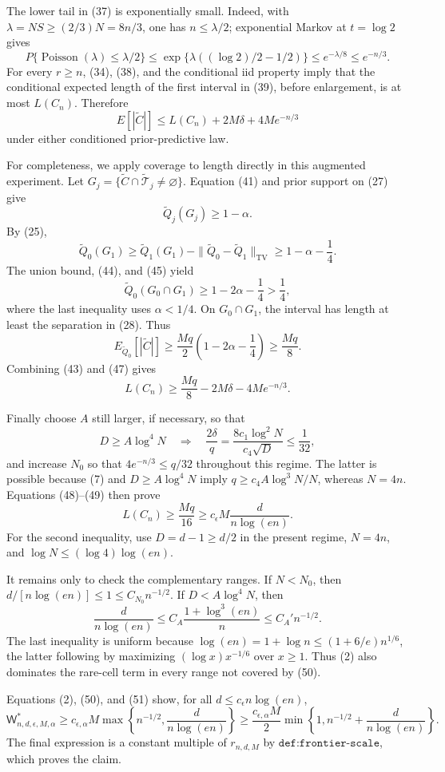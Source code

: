 The lower tail in (37) is exponentially small.  Indeed, with
\(\lambda=NS\ge(2/3)N=8n/3\), one has \(n\le\lambda/2\); exponential Markov at \(t=\log2\) gives
\[
 P\{\operatorname{Poisson}(\lambda)\le\lambda/2\}
 \le \exp\{\lambda((\log2)/2-1/2)\}
 \le e^{-\lambda/8}\le e^{-n/3}.
\tag{42}
\]
For every \(r\ge n\), (34), (38), and the conditional iid property imply that the conditional expected length of the first interval in (39), before enlargement, is at most \(L(C_n)\).  Therefore
\[
 E[|\widetilde C|]
 \le L(C_n)+2M\delta+4Me^{-n/3}
\tag{43}
\]
under either conditioned prior-predictive law.

For completeness, we apply coverage to length directly in this augmented experiment.  Let
\(G_j=\{\widetilde C\cap\widetilde{\mathcal T}_j\ne\varnothing\}\).  Equation (41) and prior support on (27) give
\[
 \widetilde Q_j(G_j)\ge1-\alpha.
\tag{44}
\]
By (25),
\[
 \widetilde Q_0(G_1)
 \ge\widetilde Q_1(G_1)
   -\|\widetilde Q_0-\widetilde Q_1\|_{\mathrm{TV}}
 \ge1-\alpha-\frac14.
\tag{45}
\]
The union bound, (44), and (45) yield
\[
 \widetilde Q_0(G_0\cap G_1)
 \ge1-2\alpha-\frac14>\frac14,
\tag{46}
\]
where the last inequality uses \(\alpha<1/4\).  On \(G_0\cap G_1\), the interval has length at least the separation in (28).  Thus
\[
 E_{\widetilde Q_0}[|\widetilde C|]
 \ge \frac{Mq}{2}\left(1-2\alpha-\frac14\right)
 \ge\frac{Mq}{8}.
\tag{47}
\]
Combining (43) and (47) gives
\[
 L(C_n)\ge\frac{Mq}{8}-2M\delta-4Me^{-n/3}.
\tag{48}
\]

Finally choose \(A\) still larger, if necessary, so that
\[
 D\ge A\log^4N
 \quad\Longrightarrow\quad
 \frac{2\delta}{q}
 =\frac{8c_1\log^2N}{c_4\sqrt D}\le\frac1{32},
\tag{49}
\]
and increase \(N_0\) so that \(4e^{-n/3}\le q/32\) throughout this regime.  The latter is possible because (7) and \(D\ge A\log^4N\) imply
\(q\ge c_4A\log^3N/N\), whereas \(N=4n\).  Equations (48)--(49) then prove
\[
 L(C_n)\ge\frac{Mq}{16}
 \ge c_\epsilon M\frac{d}{n\log(en)}.
\tag{50}
\]
For the second inequality, use \(D=d-1\ge d/2\) in the present regime,
\(N=4n\), and \(\log N\le(\log4)\log(en)\).

It remains only to check the complementary ranges.  If \(N<N_0\), then
\(d/[n\log(en)]\le1\le C_{N_0}n^{-1/2}\).  If
\(D<A\log^4N\), then
\[
 \frac{d}{n\log(en)}
 \le C_A\frac{1+\log^3(en)}{n}
 \le C_A' n^{-1/2}.
\tag{51}
\]
The last inequality is uniform because
\(\log(en)=1+\log n\le(1+6/e)n^{1/6}\), the latter following by maximizing
\((\log x)x^{-1/6}\) over \(x\ge1\).  Thus (2) also dominates the rare-cell term in every range not covered by (50).

Equations (2), (50), and (51) show, for all
\(d\le c_\epsilon n\log(en)\),
\[
 \mathsf W^*_{n,d,\epsilon,M,\alpha}
 \ge c_{\epsilon,\alpha}M
 \max\!\left\{n^{-1/2},\frac{d}{n\log(en)}\right\}
 \ge \frac{c_{\epsilon,\alpha}M}{2}
 \min\!\left\{1,n^{-1/2}+\frac{d}{n\log(en)}\right\}.
\tag{52}
\]
The final expression is a constant multiple of \(r_{n,d,M}\) by
\(\texttt{def:frontier-scale}\), which proves the claim.
